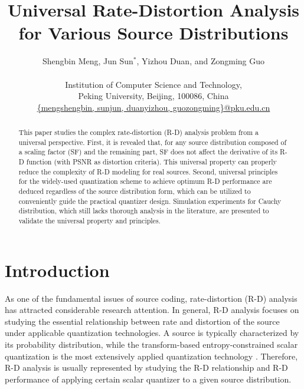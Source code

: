 \documentclass[smallabstract,smallcaptions]{dccpaper}
\begin{document}
\title
{\large
\textbf{Universal Rate-Distortion Analysis for Various Source Distributions}
}

\author{%
Shengbin Meng, Jun Sun$^{\ast}$, Yizhou Duan, and Zongming Guo\\[0.5em]
{\small\begin{minipage}{\linewidth}\begin{center}
\begin{tabular}{ccc}
Institution of Computer Science and Technology, \\
Peking University, Beijing, 100086, China\\
\url{{mengshengbin, sunjun, duanyizhou, guozongming}@pku.edu.cn}
\end{tabular}
\end{center}\end{minipage}}
}

\maketitle
\thispagestyle{empty}

\begin{abstract}
This paper studies the complex rate-distortion (R-D) analysis problem from a universal perspective. First, it is revealed that, for any source distribution composed of a scaling factor (SF) and the remaining part, SF does not affect the derivative of its R-D function (with PSNR as distortion criteria). This universal property can properly reduce the complexity of R-D modeling for real sources. Second, universal principles for the widely-used quantization scheme to achieve optimum R-D performance are deduced regardless of the source distribution form, which can be utilized to conveniently guide the practical quantizer design. Simulation experiments for Cauchy distribution, which still lacks thorough analysis in the literature, are presented to validate the universal property and principles.
\end{abstract}

\section{Introduction}

\let\thefootnote\relax{}

As one of the fundamental issues of source coding, rate-distortion (R-D) analysis has attracted considerable research attention. In general, R-D analysis focuses on studying the essential relationship between rate and distortion of the source under applicable quantization technologies. A source is typically characterized by its probability distribution, while the transform-based entropy-constrained scalar quantization is the most extensively applied quantization technology \cite{Hang_TCSVT1997}. Therefore, R-D analysis is usually represented by studying the R-D relationship and R-D performance of applying certain scalar quantizer to a given source distribution.
\end{document}

